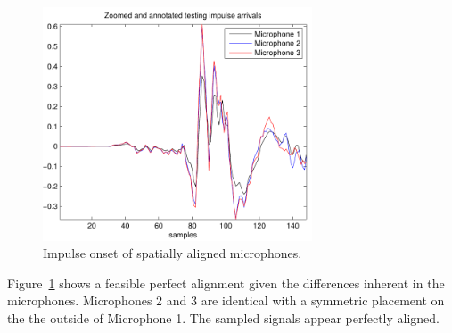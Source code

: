 \begin{figure}
  \centering
  \includegraphics[width=8cm]{alignedTestingImpulses.pdf}%
\caption{Impulse onset of spatially aligned microphones.}
\label{fig:micsalignedOnset}
\end{figure}

Figure~\ref{fig:micsalignedOnset} shows a feasible perfect alignment given the differences inherent in the microphones. Microphones 2 and 3 are identical with a symmetric placement on the the outside of Microphone 1. The sampled signals appear perfectly aligned.


